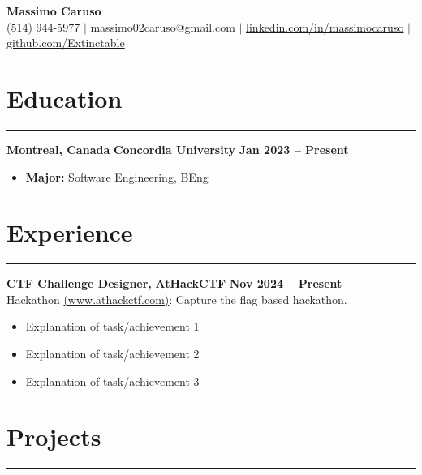 \documentclass[10pt]{article}
\begin{document}
\begin{center}
    {\Huge \textbf{Massimo Caruso}} \\
    \vspace{1mm}
    {\small (514) 944-5977 $\vert$ massimo02caruso@gmail.com $\vert$ \href{https://linkedin.com/in/massimocaruso}{linkedin.com/in/massimocaruso} $\vert$ \href{https://github.com/Extinctable}{github.com/Extinctable}}
\end{center}

\vspace{-8mm}

\section*{Education}
\vspace{-2mm}
\hrule
\vspace{0mm}
\textbf{Montreal, Canada} \hfill \textbf{Concordia University} \hfill \textbf{Jan 2023 -- Present} 
\vspace{-4mm}
\begin{itemize}[left=0.15in, itemsep=0pt]
    \item \textbf{Major:} Software Engineering, BEng
\end{itemize}

\section*{Experience}
\vspace{-2mm}
\hrule
\vspace{0mm}
\textbf{CTF Challenge Designer, } \hfill \textbf{AtHackCTF} \hfill \textbf{Nov 2024 -- Present} \\
{Hackathon {\href{https://www.athackctf.com}{(www.athackctf.com)}: Capture the flag based hackathon.}}
\vspace{-4mm}
\begin{itemize}[left=0.15in, itemsep=0pt]
    \item Explanation of task/achievement 1
    \item Explanation of task/achievement 2
    \item Explanation of task/achievement 3
\end{itemize}

\section*{Projects}
\vspace{-2mm}
\hrule
\vspace{0mm}
\end{document}
